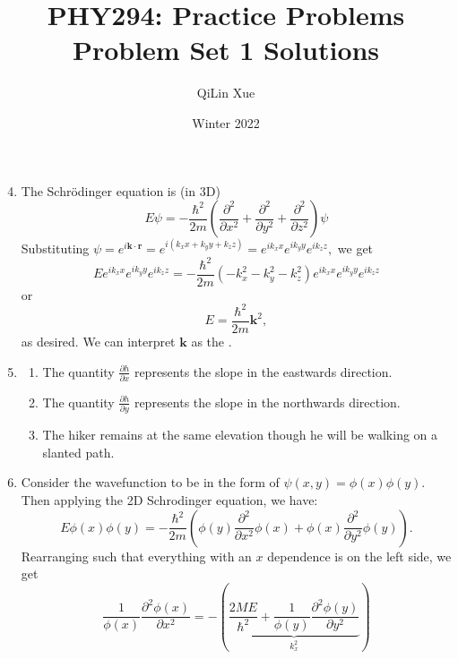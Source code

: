 \documentclass{article}
\title{PHY294: Practice Problems \\ \textbf{Problem Set 1 Solutions}}
\author{QiLin Xue}
\date{Winter 2022}
\begin{document}
\maketitle
\begin{enumerate}[label=(8.\arabic*)]
    \setcounter{enumi}{3}

    \item The Schrödinger equation is (in 3D)
    \begin{equation*}
        E \psi = -\frac{\hbar^2}{2m} \left(\frac{\partial^2}{\partial x^2} + \frac{\partial^2}{\partial y^2} + \frac{\partial^2}{\partial z^2}\right) \psi
    \end{equation*}
    Substituting $\psi = e^{i\bm{k}\cdot\bm{r}}=e^{i(k_xx+k_yy+k_zz)}=e^{ik_xx}e^{ik_yy}e^{ik_zz},$ we get 
    \begin{equation*}
        Ee^{ik_xx}e^{ik_yy}e^{ik_zz} = -\frac{\hbar^2}{2m}\left(-k_x^2-k_y^2-k_z^2\right)e^{ik_xx}e^{ik_yy}e^{ik_zz}
    \end{equation*}
    or
    \begin{equation*}
        E = \frac{\hbar^2}{2m} \bm{k}^2,
    \end{equation*}
    as desired. We can interpret $\bm{k}$ as the .
    \item \begin{enumerate}
        \item The quantity $\frac{\partial h}{\partial x}$ represents the slope in the eastwards direction.
        \item The quantity $\frac{\partial h}{\partial y}$ represents the slope in the northwards direction.
        \item The hiker remains at the same elevation though he will be walking on a slanted path.
    \end{enumerate}
    \setcounter{enumi}{8}
    \item Consider the wavefunction to be in the form of $\psi(x,y) = \phi(x)\phi(y).$ Then applying the 2D Schrodinger equation, we have:
    \begin{equation*}
        E\phi(x)\phi(y) = -\frac{\hbar^2}{2m}\left(\phi(y)\frac{\partial^2}{\partial x^2}\phi(x) + \phi(x)\frac{\partial^2}{\partial y^2}\phi(y)\right).
    \end{equation*}
    Rearranging such that everything with an $x$ dependence is on the left side, we get 
    \begin{equation*}
        \frac{1}{\phi(x)}\frac{\partial^2 \phi(x)}{\partial x^2} = -\left(\underbrace{\frac{2ME}{\hbar^2}+\frac{1}{\phi(y)}\frac{\partial^2 \phi(y)}{\partial y^2}}_{k_x^2}\right)

\end{equation*}
\end{enumerate}
\end{document}
